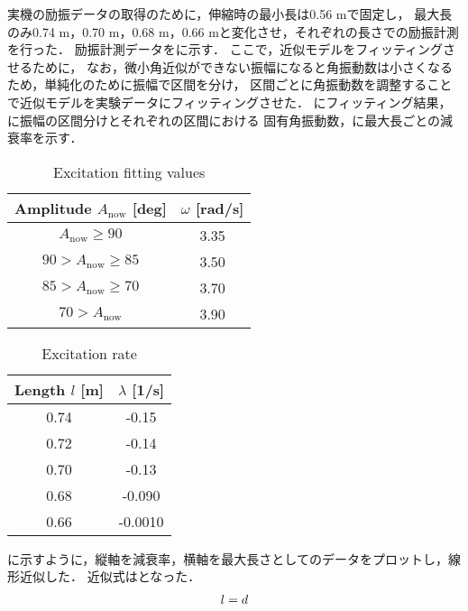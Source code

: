           実機の励振データの取得のために，伸縮時の最小長は0.56 mで固定し，
          最大長のみ0.74 m，0.70 m，0.68 m，0.66 mと変化させ，それぞれの長さでの励振計測を行った．
          励振計測データを\figref{}に示す．
          ここで，近似モデルをフィッティングさせるために，
          なお，微小角近似ができない振幅になると角振動数は小さくなるため，単純化のために振幅で区間を分け，
          区間ごとに角振動数を調整することで近似モデルを実験データにフィッティングさせた．
          \figref{}にフィッティング結果，に振幅の区間分けとそれぞれの区間における
          固有角振動数，に最大長ごとの減衰率を示す．
          \begin{table}[tb]
            \begin{center}
              \caption{Excitation fitting values}
              \vspace{2mm}
              \begin{tabular}{c|c}
                \hline
                Amplitude $A_{\mathrm{now}}$ [deg] & $\omega$ [rad/s]\\
                \hline
                $A_{\mathrm{now}}\ge90$ & 3.35 \\
                $90>A_{\mathrm{now}}\ge85$ & 3.50 \\
                $85>A_{\mathrm{now}}\ge70$ & 3.70 \\
                $70>A_{\mathrm{now}}$ & 3.90 \\                   
                \hline
              \end{tabular}
            \end{center}
          \end{table}
          \begin{table}[tb]
            \begin{center}
              \caption{Excitation rate}
              \vspace{2mm}
              \begin{tabular}{c|c}
                \hline
                Length $l$ [m] & $\lambda$ [1/s] \\
                \hline
                0.74 & -0.15 \\
                0.72 & -0.14 \\
                0.70 & -0.13 \\
                0.68 & -0.090 \\
                0.66 & -0.0010 \\                     
                \hline
              \end{tabular}
            \end{center}
          \end{table}
        \figref{}に示すように，縦軸を減衰率，横軸を最大長さとしてのデータをプロットし，線形近似した．
        近似式はとなった．
        \begin{eqnarray}
          \equlabel{length relation}
          l=d
        \end{eqnarray}

